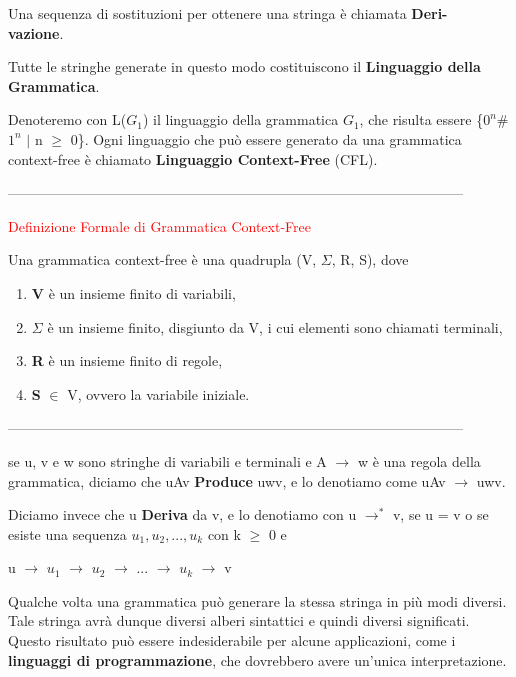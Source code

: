 \documentclass{article}
\begin{document}
Una sequenza di sostituzioni per ottenere una stringa è chiamata \textbf{Deri-
\\ vazione}.

Tutte le stringhe generate in questo modo costituiscono il \textbf{Linguaggio
della Grammatica}.

Denoteremo con L($G_1$) il linguaggio della grammatica $G_1$, che risulta essere
\{$0^n$\#$1^n$ $|$ n $\geq$ 0\}. Ogni linguaggio che può essere generato da una
grammatica context-free è chiamato \textbf{Linguaggio Context-Free} (CFL).

--------------------------------------------------------------------------------------------------

\begin{center}
    \textcolor{red}{Definizione Formale di Grammatica Context-Free}
\end{center}

Una grammatica context-free è una quadrupla (V, $\Sigma$, R, S), dove

\begin{enumerate}
    \item \textbf{V} è un insieme finito di variabili,
    \item \textbf{$\Sigma$} è un insieme finito, disgiunto da V, i cui elementi
    sono chiamati terminali,
    \item \textbf{R} è un insieme finito di regole,
    \item \textbf{S} $\in$ V, ovvero la variabile iniziale.
\end{enumerate}

--------------------------------------------------------------------------------------------------

se u, v e w sono stringhe di variabili e terminali e A $\rightarrow$ w è una
regola della grammatica, diciamo che uAv \textbf{Produce} uwv, e lo denotiamo
come uAv $\rightarrow$ uwv. 

Diciamo invece che u \textbf{Deriva} da v, e lo denotiamo con u $\rightarrow^*$
v, se u = v o se esiste una sequenza $u_1,u_2,...,u_k$ con k $\geq$ 0 e

\begin{center}
    u $\rightarrow$ $u_1$ $\rightarrow$ $u_2$ $\rightarrow$ ... $\rightarrow$
    $u_k$ $\rightarrow$ v
\end{center}

Qualche volta una grammatica può generare la stessa stringa in più modi diversi.
Tale stringa avrà dunque diversi alberi sintattici e quindi diversi significati.
Questo risultato può essere indesiderabile per alcune applicazioni, come i
\textbf{linguaggi di programmazione}, che dovrebbero avere un'unica
interpretazione. 
\end{document}
